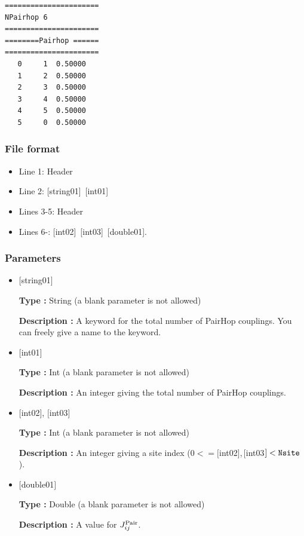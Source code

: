 \begin{minipage}{12.5cm}
\begin{screen}
\begin{verbatim}
====================== 
NPairhop 6 
====================== 
========Pairhop ====== 
====================== 
   0     1  0.50000
   1     2  0.50000
   2     3  0.50000
   3     4  0.50000
   4     5  0.50000
   5     0  0.50000
\end{verbatim}
\end{screen}
\end{minipage}

\subsubsection{File format}
 \begin{itemize}
   \item  Line 1:  Header
   \item  Line 2:   [string01]~[int01]
   \item  Lines 3-5:  Header
   \item  Lines 6-: 
   [int02]~[int03]~[double01].
  \end{itemize}
\subsubsection{Parameters}
 \begin{itemize}

   \item  $[$string01$]$
   
    {\bf Type :} String (a blank parameter is not allowed)

   {\bf Description :} A keyword for the total number of PairHop couplings. You can freely give a name to the keyword.

   \item  $[$int01$]$
   
    {\bf Type :} Int (a blank parameter is not allowed)

   {\bf Description :}  An integer giving the total number of PairHop couplings.

  \item  $[$int02$]$, $[$int03$]$
  
 {\bf Type :} Int (a blank parameter is not allowed)

{\bf Description :} An integer giving a site index ($0<= [$int02$], [$int03$]<\verb|Nsite|$).
 
 \item  $[$double01$]$
   
   {\bf Type :} Double (a blank parameter is not allowed)

  {\bf Description :}   A value for $J_{ij}^{\rm Pair}$.
  
\end{itemize}

